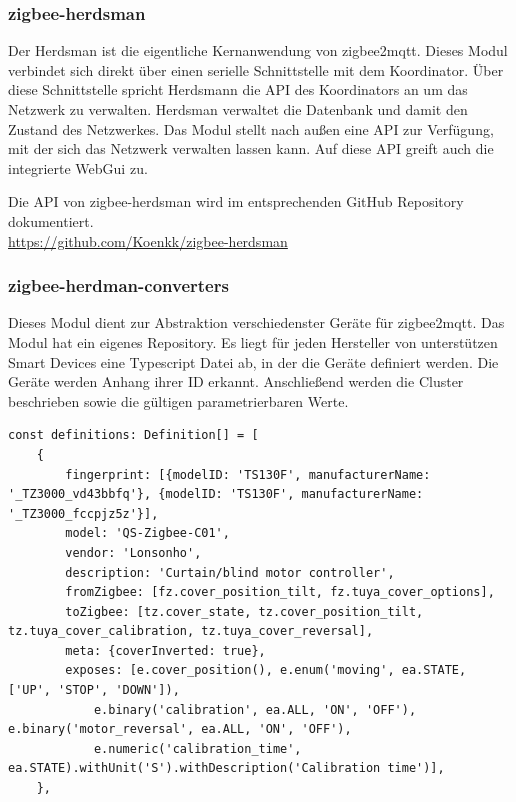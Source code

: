 \subsubsection{zigbee-herdsman}

Der Herdsman ist die eigentliche Kernanwendung von zigbee2mqtt. Dieses Modul verbindet sich direkt über einen serielle Schnittstelle mit dem Koordinator. Über diese Schnittstelle
spricht Herdsmann die API des Koordinators an um das Netzwerk zu verwalten. Herdsman verwaltet die Datenbank und damit den Zustand des Netzwerkes. Das Modul stellt nach außen
eine API zur Verfügung, mit der sich das Netzwerk verwalten lassen kann. Auf diese API greift auch die integrierte WebGui zu.

Die API von zigbee-herdsman wird im entsprechenden GitHub Repository dokumentiert. \\
\url{https://github.com/Koenkk/zigbee-herdsman}

\subsubsection{zigbee-herdman-converters}

Dieses Modul dient zur Abstraktion verschiedenster Geräte für zigbee2mqtt. Das Modul hat ein eigenes Repository. Es liegt für jeden Hersteller von unterstützen Smart Devices eine Typescript
Datei ab, in der die Geräte definiert werden. Die Geräte werden Anhang ihrer ID erkannt. Anschließend werden die Cluster beschrieben sowie die gültigen parametrierbaren Werte.

\begin{lstlisting}
const definitions: Definition[] = [
    {
        fingerprint: [{modelID: 'TS130F', manufacturerName: '_TZ3000_vd43bbfq'}, {modelID: 'TS130F', manufacturerName: '_TZ3000_fccpjz5z'}],
        model: 'QS-Zigbee-C01',
        vendor: 'Lonsonho',
        description: 'Curtain/blind motor controller',
        fromZigbee: [fz.cover_position_tilt, fz.tuya_cover_options],
        toZigbee: [tz.cover_state, tz.cover_position_tilt, tz.tuya_cover_calibration, tz.tuya_cover_reversal],
        meta: {coverInverted: true},
        exposes: [e.cover_position(), e.enum('moving', ea.STATE, ['UP', 'STOP', 'DOWN']),
            e.binary('calibration', ea.ALL, 'ON', 'OFF'), e.binary('motor_reversal', ea.ALL, 'ON', 'OFF'),
            e.numeric('calibration_time', ea.STATE).withUnit('S').withDescription('Calibration time')],
    },
  \end{lstlisting}

